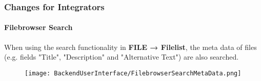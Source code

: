 \begin{frame}[fragile]
	\frametitle{Changes for Integrators}
	\framesubtitle{Filebrowser Search}

	When using the search functionality in \textbf{FILE → Filelist}, the meta data
	of files (e.g. fields "Title", "Description" and "Alternative Text") are also
	searched.

	\begin{figure}
		\texttt{[image: BackendUserInterface/FilebrowserSearchMetaData.png]}
	\end{figure}

\end{frame}

